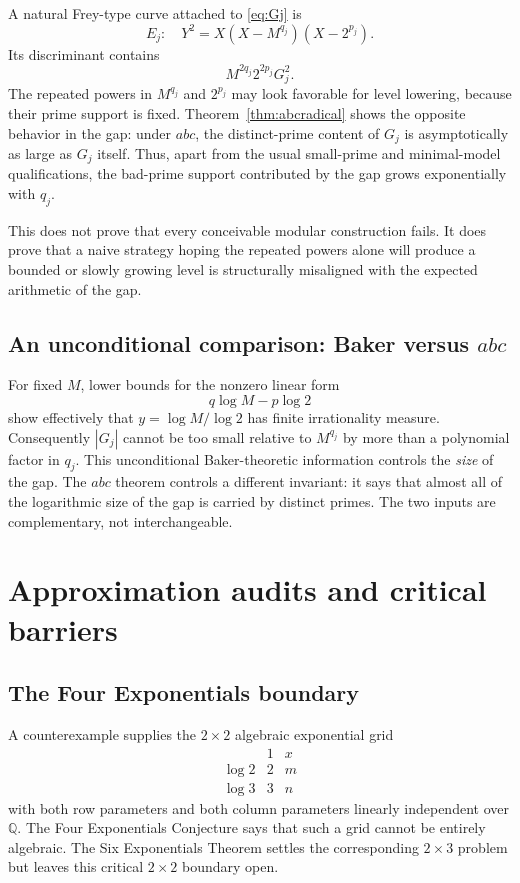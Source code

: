 \documentclass[11pt,oneside]{article}
\theoremstyle{definition}
\newcommand{\Q}{\mathbb Q}
\begin{document}
A natural Frey-type curve attached to \eqref{eq:Gj} is
\[
 E_j:\quad Y^2=X(X-M^{q_j})(X-2^{p_j}).
\]
Its discriminant contains
\[
 M^{2q_j}2^{2p_j}G_j^2.
\]
The repeated powers in $M^{q_j}$ and $2^{p_j}$ may look favorable for level lowering, because their prime support is fixed.  Theorem~\ref{thm:abcradical} shows the opposite behavior in the gap: under $abc$, the distinct-prime content of $G_j$ is asymptotically as large as $G_j$ itself.  Thus, apart from the usual small-prime and minimal-model qualifications, the bad-prime support contributed by the gap grows exponentially with $q_j$.

This does not prove that every conceivable modular construction fails.  It does prove that a naive strategy hoping the repeated powers alone will produce a bounded or slowly growing level is structurally misaligned with the expected arithmetic of the gap.

\subsection{An unconditional comparison: Baker versus $abc$}

For fixed $M$, lower bounds for the nonzero linear form
\[
  q\log M-p\log2
\]
show effectively that $y=\log M/\log2$ has finite irrationality measure.  Consequently $|G_j|$ cannot be too small relative to $M^{q_j}$ by more than a polynomial factor in $q_j$.  This unconditional Baker-theoretic information controls the \emph{size} of the gap.  The $abc$ theorem controls a different invariant: it says that almost all of the logarithmic size of the gap is carried by distinct primes.  The two inputs are complementary, not interchangeable.

\section{Approximation audits and critical barriers}

\subsection{The Four Exponentials boundary}

A counterexample supplies the $2\times2$ algebraic exponential grid
\[
 \begin{array}{c|cc}
 &1&x\\ \hline
 \log2&2&m\\
 \log3&3&n
 \end{array}
\]
with both row parameters and both column parameters linearly independent over $\Q$.  The Four Exponentials Conjecture says that such a grid cannot be entirely algebraic.  The Six Exponentials Theorem settles the corresponding $2\times3$ problem but leaves this critical $2\times2$ boundary open.
\end{document}
